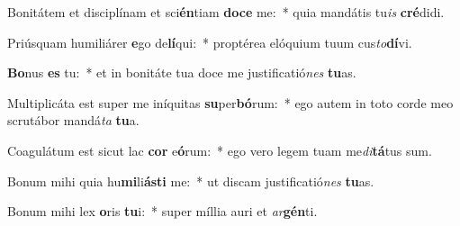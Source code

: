 \item Bonitátem et disciplínam et sci\textbf{én}tiam \textbf{do}\textbf{ce} me:~* quia mandátis tu\textit{is} \textbf{cré}didi.
\item Priúsquam humiliárer \textbf{e}go de\textbf{lí}qui:~* proptérea elóquium tuum cus\textit{to}\textbf{dí}vi.
\item \textbf{Bo}nus \textbf{es} tu:~* et in bonitáte tua doce me justificatió\textit{nes} \textbf{tu}as.
\item Multiplicáta est super me iníquitas \textbf{su}per\textbf{bó}rum:~* ego autem in toto corde meo scrutábor mandá\textit{ta} \textbf{tu}a.
\item Coagulátum est sicut lac \textbf{cor} e\textbf{ó}rum:~* ego vero legem tuam me\textit{di}\textbf{tá}tus sum.
\item Bonum mihi quia hu\textbf{mi}li\textbf{ás}\textbf{ti} me:~* ut discam justificatió\textit{nes} \textbf{tu}as.
\item Bonum mihi lex \textbf{o}ris \textbf{tu}i:~* super míllia auri et \textit{ar}\textbf{gén}ti.
